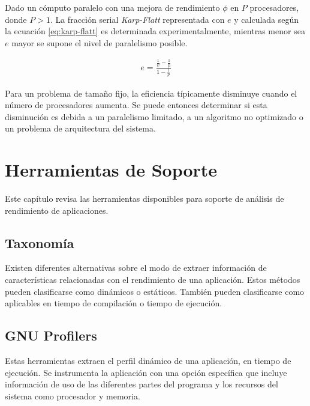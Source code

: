 \documentclass[a4paper]{report}
\begin{document}
\bigskip

Dado un c\'omputo paralelo con una mejora de rendimiento $ \phi $ en $ P $
procesadores, donde $ P > 1 $. La fracci\'on serial {\it Karp-Flatt}
representada con $ e $ y calculada seg\'un la ecuaci\'on \ref{eq:karp-flatt}
es determinada experimentalmente, mientras menor sea $ e $
mayor se supone el nivel de paralelismo posible.

\begin{eqnarray}
\label{eq:karp-flatt}
 e = \frac{\frac{1}{\psi} - \frac{1}{p}}{1 - \frac{1}{p}} 
\end{eqnarray}

Para un problema de tama\~no fijo, la eficiencia t\'ipicamente disminuye cuando
el n\'umero de procesadores aumenta. Se puede entonces determinar si esta disminuci\'on
es debida a un paralelismo limitado, a un algoritmo no optimizado o un problema de
arquitectura del sistema.

\chapter{Herramientas de Soporte}

Este cap\'itulo revisa las herramientas disponibles para soporte de an\'alisis
de rendimiento de aplicaciones.

\section{Taxonom\'ia}

Existen diferentes alternativas sobre el modo de extraer informaci\'on de
caracter\'isticas relacionadas con el rendimiento de una aplicaci\'on.
Estos m\'etodos pueden clasificarse como din\'amicos o est\'aticos.
Tambi\'en pueden clasificarse como aplicables en tiempo de compilaci\'on o
tiempo de ejecuci\'on.


\section{GNU Profilers}

Estas herramientas extraen el perfil din\'amico de una aplicaci\'on, en tiempo
de ejecuci\'on. Se instrumenta la aplicaci\'on con una opci\'on espec\'ifica que
incluye informaci\'on de uso de las diferentes partes del programa y los
recursos del sistema como procesador y memoria.

\bigskip
\end{document}
